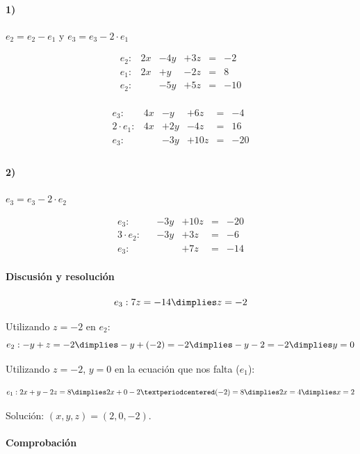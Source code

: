 \documentclass[palatino,nosec,nochap]{Docencia}
\begin{document}
\begin{problem}
\paragraph{1)} $e_2 = e_2-e_1$ y $e_3 = e_3-2·e_1$

\[
\begin{array}{rccccc}
e_2: &	2x &	-	4y &	+ 3z &	= & -2 \\
e_1: &	2x &	+	y  &	- 2z &	= & 8 \\
\hline
e_2: &	   &	-	5y &	+ 5z &	= & -10\\
\end{array}
\]	


\[
\begin{array}{rccccc}
e_3:   &	4x &	-	y   &	+ 6z &	= & -4 \\
2·e_1: &	4x &	+	2y  &	- 4z &	= & 16 \\
\hline
e_3:   &	   &	-	3y &	+ 10z &	= & -20\\
\end{array}
\]	


\paragraph{2)} $e_3 = e_3-2·e_2$

\[
\begin{array}{rccccc}
e_3: &	   &	-	3y &	+ 10z &	= & -20\\
3·e_2: &   &	-	3y &	+  3z &	= & -6\\
\hline
e_3: &	   &		   &	+  7z & = &-14
\end{array}
\]	


\paragraph{Discusión y resolución}

\[e_3: 7z=-14 \dimplies z=-2\]


Utilizando $z=-2$ en $e_2$:
\[e_2: -y+z=-2 \dimplies -y + (-2) = -2 \dimplies -y-2=-2 \dimplies y=0\]

Utilizando $z=-2$, $y=0$ en la ecuación que nos falta ($e_1$):

\[
e_1: 2x	+ y - 2z = 8 \dimplies 2x + 0 - 2·(-2) = 8 \dimplies 2x=4 \dimplies x=2
\]


Solución: $(x,y,z) = (2,0,-2)$.

\paragraph{Comprobación}


\end{problem}
\end{document}
